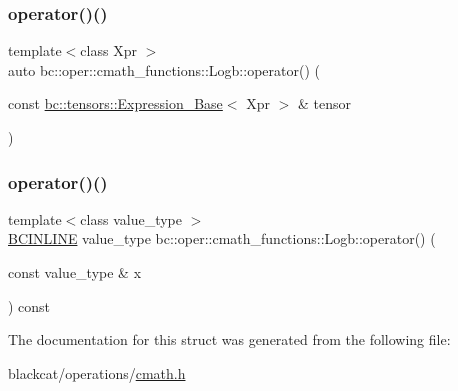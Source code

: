 \mbox{\label{structbc_1_1oper_1_1cmath__functions_1_1Logb_ad213e9ec5c4ab1410951b509175caa90}} 
\subsubsection{\texorpdfstring{operator()()}{operator()()}\hspace{0.1cm}{\footnotesize\ttfamily [2/3]}}
{\footnotesize\ttfamily template$<$class Xpr $>$ \\
auto bc\+::oper\+::cmath\+\_\+functions\+::\+Logb\+::operator() (\begin{DoxyParamCaption}\item[{const \hyperlink{classbc_1_1tensors_1_1Expression__Base}{bc\+::tensors\+::\+Expression\+\_\+\+Base}$<$ Xpr $>$ \&}]{tensor }\end{DoxyParamCaption})\hspace{0.3cm}{\ttfamily [inline]}}

\mbox{\label{structbc_1_1oper_1_1cmath__functions_1_1Logb_ab420a371e8cfaf82ec0c83ba3fd497c1}} 
\subsubsection{\texorpdfstring{operator()()}{operator()()}\hspace{0.1cm}{\footnotesize\ttfamily [3/3]}}
{\footnotesize\ttfamily template$<$class value\+\_\+type $>$ \\
\hyperlink{common_8h_a6699e8b0449da5c0fafb878e59c1d4b1}{B\+C\+I\+N\+L\+I\+NE} value\+\_\+type bc\+::oper\+::cmath\+\_\+functions\+::\+Logb\+::operator() (\begin{DoxyParamCaption}\item[{const value\+\_\+type \&}]{x }\end{DoxyParamCaption}) const\hspace{0.3cm}{\ttfamily [inline]}}



The documentation for this struct was generated from the following file\+:\begin{DoxyCompactItemize}
\item 
blackcat/operations/\hyperlink{cmath_8h}{cmath.\+h}\end{DoxyCompactItemize}
